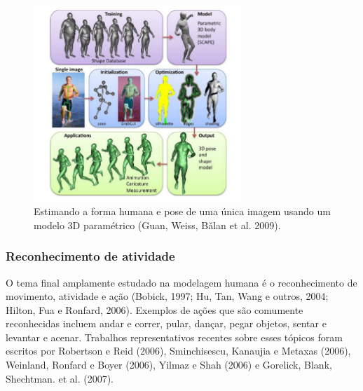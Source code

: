 \documentclass{article}
\begin{document}
\begin{figure}[!htb]
    \centering
    \includegraphics[width=0.7\textwidth]{img7.png}
    \caption{Estimando a forma humana e pose de uma única imagem usando um modelo 3D paramétrico (Guan, Weiss, Bǎlan et al. 2009).
}
    \label{fig:img8}
\end{figure}


\subsubsection{Reconhecimento de atividade}
O tema final amplamente estudado na modelagem humana é o reconhecimento de movimento, atividade e ação (Bobick, 1997; Hu, Tan, Wang e outros, 2004; Hilton, Fua e Ronfard, 2006). Exemplos de ações que são comumente reconhecidas incluem andar e correr, pular, dançar, pegar objetos, sentar e levantar e acenar. Trabalhos representativos recentes sobre esses tópicos foram escritos por Robertson e Reid (2006), Sminchisescu, Kanaujia e Metaxas (2006), Weinland, Ronfard e Boyer (2006), Yilmaz e Shah (2006) e Gorelick, Blank, Shechtman. et al. (2007).


\clearpage
\small


\end{document}
